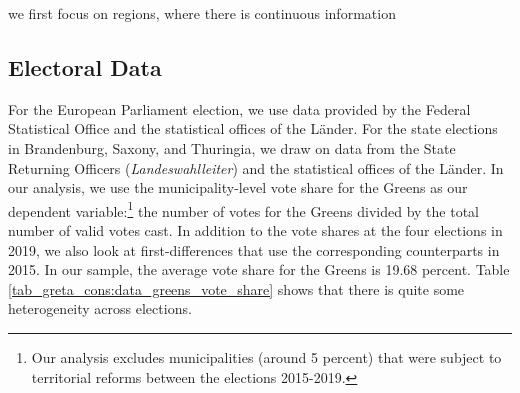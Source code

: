 we first focus on regions, where there is continuous information





\subsection{Electoral Data}
For the European Parliament election, we use data provided by the Federal Statistical Office and the statistical offices of the Länder. For the state elections in Brandenburg, Saxony, and Thuringia, we draw on data from the State Returning Officers (\textit{Landeswahlleiter}) and the statistical offices of the Länder. In our analysis, we use the municipality-level vote share for the Greens as our dependent variable:\footnote{Our analysis excludes municipalities (around 5 percent) that were subject to territorial reforms between the elections 2015-2019.} the number of votes for the Greens divided by the total number of valid votes cast. In addition to the vote shares at the four elections in 2019, we also look at first-differences that use the corresponding counterparts in 2015. In our sample, the average vote share for the Greens is 19.68 percent. Table \ref{tab_greta_cons:data_greens_vote_share} shows that there is quite some heterogeneity across elections.




